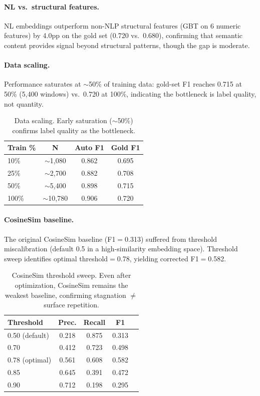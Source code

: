 \documentclass[11pt,a4paper]{article}
\begin{document}
\paragraph{NL vs.\ structural features.}
NL embeddings outperform non-NLP structural features (GBT on 6 numeric features) by 4.0pp on the gold set (0.720 vs.\ 0.680), confirming that semantic content provides signal beyond structural patterns, though the gap is moderate.

\paragraph{Data scaling.}
Performance saturates at ${\sim}$50\% of training data: gold-set F1 reaches 0.715 at 50\% (5,400 windows) vs.\ 0.720 at 100\%, indicating the bottleneck is label quality, not quantity.

\begin{table}[t]
\centering
\small
\begin{tabular}{lccc}
\toprule
\textbf{Train \%} & \textbf{N} & \textbf{Auto F1} & \textbf{Gold F1} \\
\midrule
10\% & $\sim$1,080 & 0.862 & 0.695 \\
25\% & $\sim$2,700 & 0.882 & 0.708 \\
50\% & $\sim$5,400 & 0.898 & 0.715 \\
100\% & $\sim$10,780 & 0.906 & 0.720 \\
\bottomrule
\end{tabular}
\caption{Data scaling. Early saturation ($\sim$50\%) confirms label quality as the bottleneck.}
\label{tab:data-scaling}
\end{table}

\paragraph{CosineSim baseline.}
The original CosineSim baseline (F1$=$0.313) suffered from threshold miscalibration (default 0.5 in a high-similarity embedding space).
Threshold sweep identifies optimal threshold$=$0.78, yielding corrected F1$=$0.582.

\begin{table}[t]
\centering
\small
\begin{tabular}{lcccc}
\toprule
\textbf{Threshold} & \textbf{Prec.} & \textbf{Recall} & \textbf{F1} \\
\midrule
0.50 (default) & 0.218 & 0.875 & 0.313 \\
0.70 & 0.412 & 0.723 & 0.498 \\
0.78 (optimal) & 0.561 & 0.608 & 0.582 \\
0.85 & 0.645 & 0.391 & 0.472 \\
0.90 & 0.712 & 0.198 & 0.295 \\
\bottomrule
\end{tabular}
\caption{CosineSim threshold sweep. Even after optimization, CosineSim remains the weakest baseline, confirming stagnation $\neq$ surface repetition.}
\label{tab:cosinesim}
\end{table}
\end{document}

